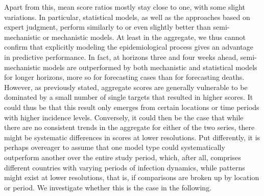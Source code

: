 Apart from this, mean score ratios mostly stay close to one, with some slight variations. In particular, statistical models, as well as the approaches based on expert judgment, perform similarly to or even slightly better than semi-mechanistic or mechanistic models. At least in the aggregate, we thus cannot confirm that explicitly modeling the epidemiological process gives an advantage in predictive performance. %
In fact, at horizons three and four weeks ahead, semi-mechanistic models are outperformed by both mechanistic and statistical models for longer horizons, more so for forecasting cases than for forecasting deaths.\\ 
However, as previously stated, aggregate scores are generally vulnerable to be dominated by a small number of single targets that resulted in higher scores. It could thus be that this result only emerges from certain locations or time periods with higher incidence levels. Conversely, it could then be the case that while there are no consistent trends in the aggregate for either of the two series, there might be systematic differences in scores at lower resolutions. Put differently, it is perhaps overeager to assume that one model type could systematically outperform another over the entire study period, which, after all, comprises different countries with varying periods of infection dynamics, while patterns might exist at lower resolutions, that is, if comparisons are broken up by location or period. We investigate whether this is the case in the following. 
